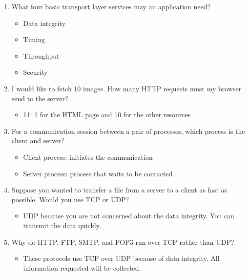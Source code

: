 \documentclass{article}
\begin{document}
\begin{enumerate}
\begin{figure}[!h]
\end{figure}
\item What four basic transport layer services may an application need?
\begin{itemize}
\item Data integrity
\item Timing
\item Throughput
\item Security
\end{itemize}
\item I would like to fetch 10 images. How many HTTP requests must my browser send to the server?
\begin{itemize}
\item 11: 1 for the HTML page and 10 for the other resources
\end{itemize}
\newpage
\item For a communication session between a pair of processes, which process is the client and server?

\begin{itemize}
\item Client process: initiates the communication
\item Server process: process that waits to be contacted
\end{itemize}

\item Suppose you wanted to transfer a file from a server to a client as fast as possible. Would you use TCP or UDP?
\begin{itemize}
\item UDP because you are not concerned about the data integrity. You can transmit the data quickly.
\end{itemize}

\item Why do HTTP, FTP, SMTP, and POP3 run over TCP rather than UDP?
\begin{itemize}
\item These protocols use TCP over UDP because of data integrity. All information requested will be collected.
\end{itemize}
\end{enumerate}
\end{document}
